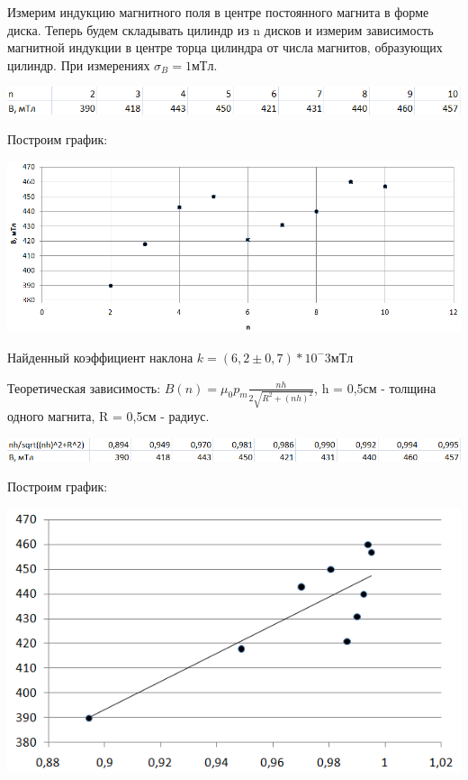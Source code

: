 \documentclass[12pt]{article}
\begin{document}
    Измерим индукцию магнитного поля в центре постоянного магнита в форме диска.
    Теперь будем складывать цилиндр из n дисков и измерим зависимость магнитной
    индукции в центре торца цилиндра от числа магнитов, образующих цилиндр. При измерениях $\sigma_B = 1мТл$.
    
    \begin{center}
    	\includegraphics[width=15cm]{table3.png}
    	
    	\pagebreak
    	Построим график:
    	
    	\includegraphics[width=15cm]{graph3.png}
    \end{center}
    
    Найденный коэффициент наклона $k = (6,2 \pm 0,7) * 10^-3 мТл$
    
    Теоретическая зависимость: $B(n) = \mu_0 p_m \frac{nh}{2\sqrt{R^2 + (nh)^2}}$, h = 0,5см - толщина одного магнита, R = 0,5см - радиус.
    
    \begin{center}
    	\includegraphics[width=15cm]{table4.png}
    	
    	Построим график:
    	
    	\includegraphics[width=15cm]{graph4.png}
    \end{center}
    
\end{document}
